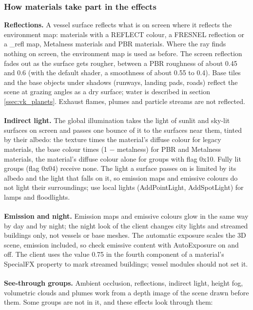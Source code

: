 \documentclass[Orbiter Developer Manual.tex]{subfiles}
\begin{document}
\begin{sloppypar}
\subsubsection{How materials take part in the effects}
\label{sssec:vk_mtrl_fx}
\textbf{Reflections.} A vessel surface reflects what is on screen where it reflects the environment map: materials with a REFLECT colour, a FRESNEL reflection or a \_refl map, Metalness materials and PBR materials. Where the ray finds nothing on screen, the environment map is used as before. The screen reflection fades out as the surface gets rougher, between a PBR roughness of about 0.45 and 0.6 (with the default shader, a smoothness of about 0.55 to 0.4). Base tiles and the base objects under shadows (runways, landing pads, roads) reflect the scene at grazing angles as a dry surface; water is described in section \ref{ssec:vk_planets}. Exhaust flames, plumes and particle streams are not reflected.\\
\\
\textbf{Indirect light.} The global illumination takes the light of sunlit and sky-lit surfaces on screen and passes one bounce of it to the surfaces near them, tinted by their albedo: the texture times the material's diffuse colour for legacy materials, the base colour times (1 $-$ metalness) for PBR and Metalness materials, the material's diffuse colour alone for groups with flag 0x10. Fully lit groups (flag 0x04) receive none. The light a surface passes on is limited by its albedo and the light that falls on it, so emission maps and emissive colours do not light their surroundings; use local lights (AddPointLight, AddSpotLight) for lamps and floodlights.\\
\\
\textbf{Emission and night.} Emission maps and emissive colours glow in the same way by day and by night; the night look of the client changes city lights and streamed buildings only, not vessels or base meshes. The automatic exposure scales the 3D scene, emission included, so check emissive content with AutoExposure on and off. The client uses the value 0.75 in the fourth component of a material's SpecialFX property to mark streamed buildings; vessel modules should not set it.\\
\\
\textbf{See-through groups.} Ambient occlusion, reflections, indirect light, height fog, volumetric clouds and plumes work from a depth image of the scene drawn before them. Some groups are not in it, and these effects look through them:


\end{sloppypar}
\end{document}
